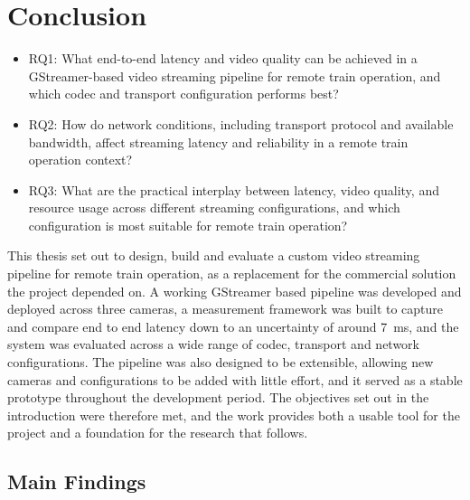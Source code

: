 \section{Conclusion}

\begin{itemize}
    \item RQ1: What end-to-end latency and video quality can be achieved in a GStreamer-based video streaming pipeline for remote train operation, and which codec and transport configuration performs best?
    \item RQ2: How do network conditions, including transport protocol and available bandwidth, affect streaming latency and reliability in a remote train operation context?
    \item RQ3: What are the practical interplay between latency, video quality, and resource usage across different streaming configurations, and which configuration is most suitable for remote train operation?
\end{itemize}

This thesis set out to design, build and evaluate a custom video streaming pipeline for remote train operation, as a replacement for the commercial solution the project depended on. A working GStreamer based pipeline was developed and deployed across three cameras, a measurement framework was built to capture and compare end to end latency down to an uncertainty of around 7~ms, and the system was evaluated across a wide range of codec, transport and network configurations. The pipeline was also designed to be extensible, allowing new cameras and configurations to be added with little effort, and it served as a stable prototype throughout the development period. The objectives set out in the introduction were therefore met, and the work provides both a usable tool for the project and a foundation for the research that follows.

\subsection{Main Findings}

